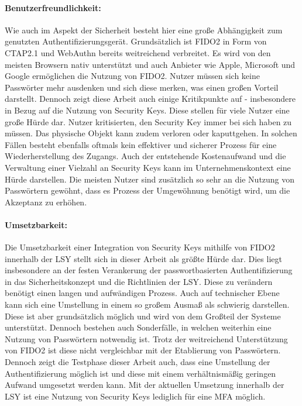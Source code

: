 \paragraph*{Benutzerfreundlichkeit:} Wie auch im Aspekt der Sicherheit besteht hier eine große Abhängigkeit zum genutzten Authentifizierungsgerät. Grundsätzlich ist \ac{FIDO}2 in Form von CTAP2.1 und WebAuthn bereits weitreichend verbreitet. Es wird von den meisten Browsern nativ unterstützt und auch Anbieter wie Apple, Microsoft und Google ermöglichen die Nutzung von \ac{FIDO}2. Nutzer müssen sich keine Passwörter mehr ausdenken und sich diese merken, was einen großen Vorteil darstellt. Dennoch zeigt diese Arbeit auch einige Kritikpunkte auf - insbesondere in Bezug auf die Nutzung von Security Keys. Diese stellen für viele Nutzer eine große Hürde dar. Nutzer kritisierten, den Security Key immer bei sich haben zu müssen. Das physische Objekt kann zudem verloren oder kaputtgehen. In solchen Fällen besteht ebenfalls oftmals kein effektiver und sicherer Prozess für eine Wiederherstellung des Zugangs. Auch der entstehende Kostenaufwand und die Verwaltung einer Vielzahl an Security Keys kann im Unternehmenskontext eine Hürde darstellen. Die meisten Nutzer sind zusätzlich so sehr an die Nutzung von Passwörtern gewöhnt, dass es Prozess der Umgewöhnung benötigt wird, um die Akzeptanz zu erhöhen.

\paragraph*{Umsetzbarkeit:} Die Umsetzbarkeit einer Integration von Security Keys mithilfe von \ac{FIDO}2 innerhalb der \ac{LSY} stellt sich in dieser Arbeit als größte Hürde dar. Dies liegt insbesondere an der festen Verankerung der passwortbasierten Authentifizierung in das Sicherheitskonzept und die Richtlinien der \ac{LSY}. Diese zu verändern benötigt einen langen und aufwändigen Prozess. Auch auf technischer Ebene kann sich eine Umstellung in einem so großem Ausmaß als schwierig darstellen. Diese ist aber grundsätzlich möglich und wird von dem Großteil der Systeme unterstützt. Dennoch bestehen auch Sonderfälle, in welchen weiterhin eine Nutzung von Passwörtern notwendig ist. Trotz der weitreichend Unterstützung von \ac{FIDO}2 ist diese nicht vergleichbar mit der Etablierung von Passwörtern. Dennoch zeigt die Testphase dieser Arbeit auch, dass eine Umstellung der Authentifizierung möglich ist und diese mit einem verhältnismäßig geringen Aufwand umgesetzt werden kann. Mit der aktuellen Umsetzung innerhalb der \ac{LSY} ist eine Nutzung von Security Keys lediglich für eine \ac{MFA} möglich. 

